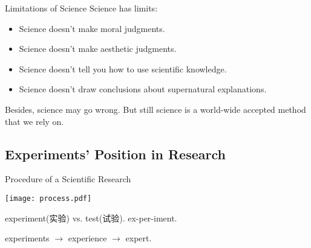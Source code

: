\documentclass[14pt,t]{beamer}
\begin{document}
\begin{frame}{Limitations of Science}
Science has limits:
\begin{itemize}
    \item Science doesn't make moral judgments.
    \item Science doesn't make aesthetic judgments.
    \item Science doesn't tell you how to use scientific knowledge.
    \item Science doesn't draw conclusions about supernatural explanations.
\end{itemize}
    Besides, science may go wrong. But still science is a world-wide
    accepted method that we rely on.
\end{frame}

\iffalse
\begin{frame}{Scientific Literacy Training}
\centering
\texttt{[image: fig2]}

Sampling Survey on the Scientific Literacy in China
\end{frame}

\begin{frame}{QUIZ-1}
    \small
\begin{itemize}
    \item 我们呼吸的氧气来源于植物. (T/F)
    \item 激光是通过汇聚声波产生的. (T/F)
    \item 所有的放射性现象都是人为的. (T/F)
    \item 人类是由早期的动物演化而来的. (T/F)
    \item 第一手资料不应借助于
        
        A. 实地调查. B.查找原始资料. C.听取专家评论.
\end{itemize}
\end{frame}
\fi

\subsection{Experiments' Position in Research}

\begin{frame}{Procedure of a Scientific Research}
\begin{center}
    \texttt{[image: process.pdf]}
\end{center}

    experiment(实验) vs. test(试验).  ex-per-iment. 

    experiments $\to$ experience $\to$ expert.
\end{frame}
\end{document}
